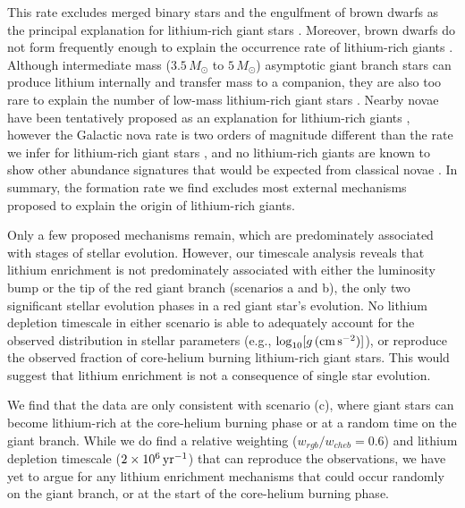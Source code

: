 \documentclass[twocolumn]{aastex62}
\newcommand{\logg}{\log_{10}[g\,({\rm cm\,s}^{-2})]}
\begin{document}
This rate excludes merged binary stars \citep[$0.01\,{\rm yr}^{-1}$;][]{Andrievsky_1999}
and the engulfment of brown dwarfs \citep{Siess_1999} as the principal explanation
for lithium-rich giant stars \citep{Politano_2010,Ivanova_2013}. 
Moreover, brown dwarfs do not form frequently enough to explain the occurrence rate of 
lithium-rich giants \citep{Cumming_2008}. Although intermediate mass 
($3.5\,M_\odot$ to $5\,M_\odot$) asymptotic giant branch stars can produce lithium
internally and transfer mass to a companion, they are also too rare to explain the number
of low-mass lithium-rich giant stars \citep{Karakas_2016}.
Nearby novae have been tentatively proposed as an explanation for lithium-rich giants \citep{Gratton_1989},  however the Galactic nova rate is two orders of magnitude different than the rate we infer for lithium-rich giant 
stars \citep[$50\,{\rm yr}^{-1}$;][]{Shafter_2017}, and no lithium-rich giants are known to show other abundance signatures that would be expected from classical novae \citep{Melo_2005}.
In summary, the formation rate we find excludes most 
external mechanisms proposed to explain the origin of lithium-rich giants.


Only a few proposed mechanisms remain, which are predominately associated with
stages of stellar evolution. However, our timescale analysis reveals that 
lithium enrichment is not predominately associated with either the luminosity
bump or the tip of the red giant branch (scenarios a and b), the only two
significant stellar evolution phases in a red giant star's evolution.
No lithium depletion timescale in either scenario is able to adequately account
for the observed distribution in stellar parameters (e.g., $\logg$), or reproduce
the observed fraction of core-helium burning lithium-rich giant stars.
This would suggest that lithium enrichment is not a consequence of single star evolution.


We find that the data are only consistent with scenario (c), where giant stars can become
lithium-rich at the core-helium burning phase or at a random time on the giant
branch. While we do find a relative weighting ($w_{rgb}/w_{cheb} = 0.6$) and lithium
depletion timescale ($2\times10^6\,{\rm yr}^{-1}$) that can reproduce the
observations, we have yet to argue for any lithium enrichment mechanisms that 
could occur randomly on the giant branch, or at the start of the core-helium
burning phase.
\end{document}
